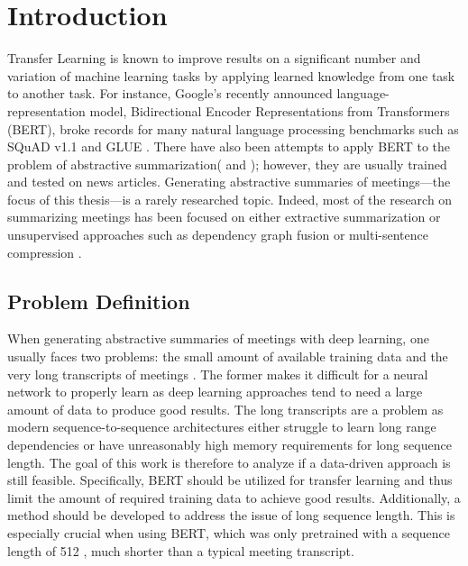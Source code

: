 \chapter{Introduction}\label{ch:Introduction}


Transfer Learning is known to improve results on a significant number and variation of machine learning tasks by applying learned knowledge from one task to another task.
For instance, Google's recently announced language-representation model, Bidirectional Encoder Representations from Transformers (BERT), broke records for many natural language processing benchmarks \cite[p.~5--7]{devlin2018bert} such as  SQuAD v1.1 \cite{rajpurkar-etal-2016-squad} and GLUE \cite{1804.07461}.
There have also been attempts to apply BERT to the problem of abstractive summarization(\cite{1902.09243} and \cite{1908.08345}); however, they are usually trained and tested on news articles.
Generating abstractive summaries of meetings---the focus of this thesis---is a rarely researched topic. %
Indeed, most of the research on summarizing meetings has been focused on either extractive summarization or unsupervised approaches such as dependency graph fusion \cite{1609.07035} or multi-sentence compression \cite{shang-etal-2018-unsupervised}.


\section{Problem Definition}

When generating abstractive summaries of meetings with deep learning, one usually faces two problems: the small amount of available training data and the very long transcripts of meetings \cite[p.~650--651]{10.1007/978-3-030-20521-8_53}.
The former makes it difficult for a neural network to properly learn as deep learning approaches tend to need a large amount of data to produce good results.
The long transcripts are a problem as modern sequence-to-sequence architectures either struggle to learn long range dependencies \cite{Hochreiter01gradientflow} or have unreasonably high memory requirements for long sequence length.
The goal of this work is therefore to analyze if a data-driven approach is still feasible. %
Specifically, BERT should be utilized for transfer learning and thus limit the amount of required training data to achieve good results.
Additionally, a method should be developed to address the issue of long sequence length.
This is especially crucial when using BERT, which was only pretrained with a sequence length of 512 \cite[p.~13]{devlin2018bert}, much shorter than a typical meeting transcript.

